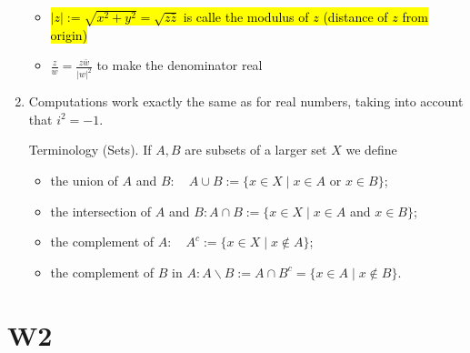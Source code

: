 \documentclass[10pt]{article}
\begin{document}
\begin{enumerate}
\begin{itemize}
  \item \hl{$|z|:=\sqrt{x^{2}+y^{2}}=\sqrt{z \bar{z}}$ is calle the modulus of $z$ (distance of $z$ from origin)}

  \item $\frac{z}{w}=\frac{z \bar{w}}{|w|^{2}}$ to make the denominator real

\end{itemize}

\item Computations work exactly the same as for real numbers, taking into account that $i^{2}=-1$.

Terminology (Sets). If $A, B$ are subsets of a larger set $X$ we define

\begin{itemize}
  \item the union of $A$ and $B: \quad A \cup B:=\{x \in X \mid x \in A$ or $x \in B\}$;

  \item the intersection of $A$ and $B: A \cap B:=\{x \in X \mid x \in A$ and $x \in B\}$;

  \item the complement of $A: \quad A^{c}:=\{x \in X \mid x \notin A\}$;

  \item the complement of $B$ in $A: A \backslash B:=A \cap B^{c}=\{x \in A \mid x \notin B\}$.

\end{itemize}

\end{enumerate}

\newpage



\section{W2}
\end{document}
